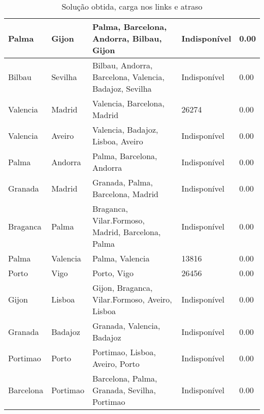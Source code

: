 \begin{table}[!htb]
{\begin{tabular}{|l|l|l|l|l|}
Palma & Gijon & Palma, Barcelona, Andorra, Bilbau, Gijon & Indisponível & 0.00 \\ \hline
Bilbau & Sevilha & Bilbau, Andorra, Barcelona, Valencia, Badajoz, Sevilha & Indisponível & 0.00 \\ \hline
Valencia & Madrid & Valencia, Barcelona, Madrid & 26274 & 0.00 \\ \hline
Valencia & Aveiro & Valencia, Badajoz, Lisboa, Aveiro & Indisponível & 0.00 \\ \hline
Palma & Andorra & Palma, Barcelona, Andorra & Indisponível & 0.00 \\ \hline
Granada & Madrid & Granada, Palma, Barcelona, Madrid & Indisponível & 0.00 \\ \hline
Braganca & Palma & Braganca, Vilar.Formoso, Madrid, Barcelona, Palma & Indisponível & 0.00 \\ \hline
Palma & Valencia & Palma, Valencia & 13816 & 0.00 \\ \hline
Porto & Vigo & Porto, Vigo & 26456 & 0.00 \\ \hline
Gijon & Lisboa & Gijon, Braganca, Vilar.Formoso, Aveiro, Lisboa & Indisponível & 0.00 \\ \hline
Granada & Badajoz & Granada, Valencia, Badajoz & Indisponível & 0.00 \\ \hline
Portimao & Porto & Portimao, Lisboa, Aveiro, Porto & Indisponível & 0.00 \\ \hline
Barcelona & Portimao & Barcelona, Palma, Granada, Sevilha, Portimao & Indisponível & 0.00 \\ \hline
\end{tabular}}
\caption[]{Solução obtida, carga nos links e atraso}
\end{table}

